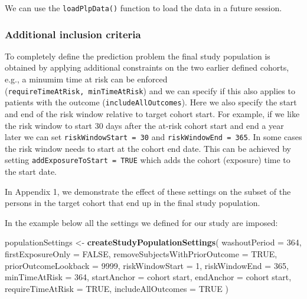 \documentclass[
]{article}
\newenvironment{Shaded}{\begin{snugshade}}{\end{snugshade}}
\newcommand{\AttributeTok}[1]{\textcolor[rgb]{0.13,0.29,0.53}{#1}}
\newcommand{\ConstantTok}[1]{\textcolor[rgb]{0.56,0.35,0.01}{#1}}
\newcommand{\DecValTok}[1]{\textcolor[rgb]{0.00,0.00,0.81}{#1}}
\newcommand{\FunctionTok}[1]{\textcolor[rgb]{0.13,0.29,0.53}{\textbf{#1}}}
\newcommand{\NormalTok}[1]{#1}
\newcommand{\OtherTok}[1]{\textcolor[rgb]{0.56,0.35,0.01}{#1}}
\newcommand{\StringTok}[1]{\textcolor[rgb]{0.31,0.60,0.02}{#1}}
\begin{document}
We can use the \texttt{loadPlpData()} function to load the data in a
future session.

\hypertarget{additional-inclusion-criteria-1}{%
\subsubsection{Additional inclusion
criteria}\label{additional-inclusion-criteria-1}}

To completely define the prediction problem the final study population
is obtained by applying additional constraints on the two earlier
defined cohorts, e.g., a minumim time at risk can be enforced
(\texttt{requireTimeAtRisk,\ minTimeAtRisk}) and we can specify if this
also applies to patients with the outcome (\texttt{includeAllOutcomes}).
Here we also specify the start and end of the risk window relative to
target cohort start. For example, if we like the risk window to start 30
days after the at-risk cohort start and end a year later we can set
\texttt{riskWindowStart\ =\ 30} and \texttt{riskWindowEnd\ =\ 365}. In
some cases the risk window needs to start at the cohort end date. This
can be achieved by setting \texttt{addExposureToStart\ =\ TRUE} which
adds the cohort (exposure) time to the start date.

In Appendix 1, we demonstrate the effect of these settings on the subset
of the persons in the target cohort that end up in the final study
population.

In the example below all the settings we defined for our study are
imposed:

\begin{Shaded}
\begin{Highlighting}[]
\NormalTok{    populationSettings }\OtherTok{\textless{}{-}} \FunctionTok{createStudyPopulationSettings}\NormalTok{(}
      \AttributeTok{washoutPeriod =} \DecValTok{364}\NormalTok{,}
      \AttributeTok{firstExposureOnly =} \ConstantTok{FALSE}\NormalTok{,}
      \AttributeTok{removeSubjectsWithPriorOutcome =} \ConstantTok{TRUE}\NormalTok{,}
      \AttributeTok{priorOutcomeLookback =} \DecValTok{9999}\NormalTok{,}
      \AttributeTok{riskWindowStart =} \DecValTok{1}\NormalTok{,}
      \AttributeTok{riskWindowEnd =} \DecValTok{365}\NormalTok{, }
      \AttributeTok{minTimeAtRisk =} \DecValTok{364}\NormalTok{,}
      \AttributeTok{startAnchor =} \StringTok{\textquotesingle{}cohort start\textquotesingle{}}\NormalTok{,}
      \AttributeTok{endAnchor =} \StringTok{\textquotesingle{}cohort start\textquotesingle{}}\NormalTok{,}
      \AttributeTok{requireTimeAtRisk =} \ConstantTok{TRUE}\NormalTok{,}
      \AttributeTok{includeAllOutcomes =} \ConstantTok{TRUE}
\NormalTok{    )}
\end{Highlighting}
\end{Shaded}
\end{document}
